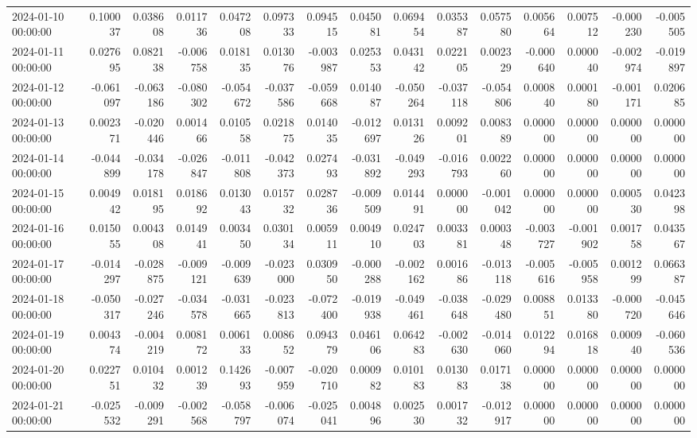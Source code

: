 \begin{tabular}{lrrrrrrrrrrrrrr}
2024-01-10 00:00:00 & 0.100037 & 0.038608 & 0.011736 & 0.047208 & 0.097333 & 0.094515 & 0.045081 & 0.069454 & 0.035387 & 0.057580 & 0.005664 & 0.007512 & -0.000230 & -0.005505 \\
2024-01-11 00:00:00 & 0.027695 & 0.082138 & -0.006758 & 0.018135 & 0.013076 & -0.003987 & 0.025353 & 0.043142 & 0.022105 & 0.002329 & -0.000640 & 0.000040 & -0.002974 & -0.019897 \\
2024-01-12 00:00:00 & -0.061097 & -0.063186 & -0.080302 & -0.054672 & -0.037586 & -0.059668 & 0.014087 & -0.050264 & -0.037118 & -0.054806 & 0.000840 & 0.000180 & -0.001171 & 0.020685 \\
2024-01-13 00:00:00 & 0.002371 & -0.020446 & 0.001466 & 0.010558 & 0.021875 & 0.014035 & -0.012697 & 0.013126 & 0.009201 & 0.008389 & 0.000000 & 0.000000 & 0.000000 & 0.000000 \\
2024-01-14 00:00:00 & -0.044899 & -0.034178 & -0.026847 & -0.011808 & -0.042373 & 0.027493 & -0.031892 & -0.049293 & -0.016793 & 0.002260 & 0.000000 & 0.000000 & 0.000000 & 0.000000 \\
2024-01-15 00:00:00 & 0.004942 & 0.018195 & 0.018692 & 0.013043 & 0.015732 & 0.028736 & -0.009509 & 0.014491 & 0.000000 & -0.001042 & 0.000000 & 0.000000 & 0.000530 & 0.042398 \\
2024-01-16 00:00:00 & 0.015055 & 0.004308 & 0.014941 & 0.003450 & 0.030134 & 0.005911 & 0.004910 & 0.024703 & 0.003381 & 0.000348 & -0.003727 & -0.001902 & 0.001758 & 0.043567 \\
2024-01-17 00:00:00 & -0.014297 & -0.028875 & -0.009121 & -0.009639 & -0.023000 & 0.030950 & -0.000288 & -0.002162 & 0.001686 & -0.013118 & -0.005616 & -0.005958 & 0.001299 & 0.066387 \\
2024-01-18 00:00:00 & -0.050317 & -0.027246 & -0.034578 & -0.031665 & -0.023813 & -0.072400 & -0.019938 & -0.049461 & -0.038648 & -0.029480 & 0.008851 & 0.013380 & -0.000720 & -0.045646 \\
2024-01-19 00:00:00 & 0.004374 & -0.004219 & 0.008172 & 0.006133 & 0.008652 & 0.094379 & 0.046106 & 0.064283 & -0.002630 & -0.014060 & 0.012294 & 0.016818 & 0.000940 & -0.060536 \\
2024-01-20 00:00:00 & 0.022751 & 0.010432 & 0.001239 & 0.142693 & -0.007959 & -0.020710 & 0.000982 & 0.010183 & 0.013083 & 0.017138 & 0.000000 & 0.000000 & 0.000000 & 0.000000 \\
2024-01-21 00:00:00 & -0.025532 & -0.009291 & -0.002568 & -0.058797 & -0.006074 & -0.025041 & 0.004896 & 0.002530 & 0.001732 & -0.012917 & 0.000000 & 0.000000 & 0.000000 & 0.000000 \\

\end{tabular}
